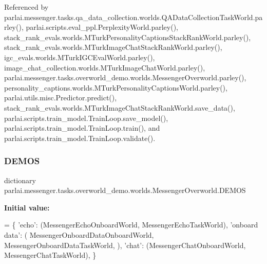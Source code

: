 Referenced by parlai.\+messenger.\+tasks.\+qa\+\_\+data\+\_\+collection.\+worlds.\+Q\+A\+Data\+Collection\+Task\+World.\+parley(), parlai.\+scripts.\+eval\+\_\+ppl.\+Perplexity\+World.\+parley(), stack\+\_\+rank\+\_\+evals.\+worlds.\+M\+Turk\+Personality\+Captions\+Stack\+Rank\+World.\+parley(), stack\+\_\+rank\+\_\+evals.\+worlds.\+M\+Turk\+Image\+Chat\+Stack\+Rank\+World.\+parley(), igc\+\_\+evals.\+worlds.\+M\+Turk\+I\+G\+C\+Eval\+World.\+parley(), image\+\_\+chat\+\_\+collection.\+worlds.\+M\+Turk\+Image\+Chat\+World.\+parley(), parlai.\+messenger.\+tasks.\+overworld\+\_\+demo.\+worlds.\+Messenger\+Overworld.\+parley(), personality\+\_\+captions.\+worlds.\+M\+Turk\+Personality\+Captions\+World.\+parley(), parlai.\+utils.\+misc.\+Predictor.\+predict(), stack\+\_\+rank\+\_\+evals.\+worlds.\+M\+Turk\+Image\+Chat\+Stack\+Rank\+World.\+save\+\_\+data(), parlai.\+scripts.\+train\+\_\+model.\+Train\+Loop.\+save\+\_\+model(), parlai.\+scripts.\+train\+\_\+model.\+Train\+Loop.\+train(), and parlai.\+scripts.\+train\+\_\+model.\+Train\+Loop.\+validate().

\mbox{\label{classparlai_1_1messenger_1_1tasks_1_1overworld__demo_1_1worlds_1_1MessengerOverworld_a03ff4783f21f554dfba79dc51adbc92e}} 
\subsubsection{\texorpdfstring{D\+E\+M\+OS}{DEMOS}}
{\footnotesize\ttfamily dictionary parlai.\+messenger.\+tasks.\+overworld\+\_\+demo.\+worlds.\+Messenger\+Overworld.\+D\+E\+M\+OS\hspace{0.3cm}{\ttfamily [static]}}

{\bfseries Initial value\+:}
\begin{DoxyCode}
=  \{
        \textcolor{stringliteral}{'echo'}: (MessengerEchoOnboardWorld, MessengerEchoTaskWorld),
        \textcolor{stringliteral}{'onboard data'}: (
            MessengerOnboardDataOnboardWorld,
            MessengerOnboardDataTaskWorld,
        ),
        \textcolor{stringliteral}{'chat'}: (MessengerChatOnboardWorld, MessengerChatTaskWorld),
    \}
\end{DoxyCode}


